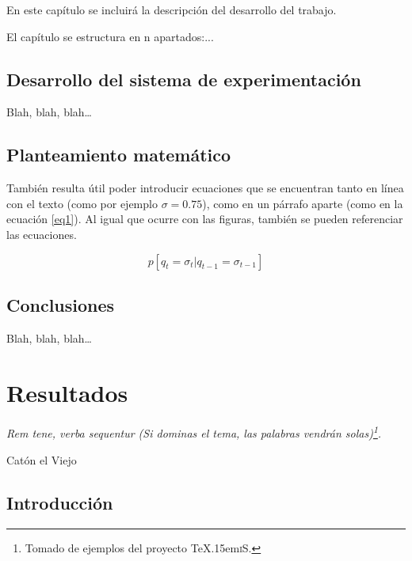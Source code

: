 \documentclass[spanish,openright]{book}
\def\texis{\TeX \raise.15em\hbox{\textsc{i}}S}
\newenvironment{FraseCelebre}{\begin{list}{}{\setlength{\leftmargin}{0.5\textwidth}\setlength{\parsep}{0cm}\addtolength{\topsep}{0.5cm}}
  }
  {\unskip \end{list}}
\newenvironment{Frase}{\item \begin{flushright}\small\em}{\end{flushright}}
\newenvironment{Fuente}{\item \begin{flushright}\small}{\end{flushright}}
\begin{document}
En este capítulo se incluirá la descripción del desarrollo del trabajo.

El capítulo se estructura en n apartados:...


\section{Desarrollo del sistema de experimentación}
\label{sec:desarr-del-sist}

Blah, blah, blah\ldots


\section{Planteamiento matemático}
\label{sec:libr-desarr}

También resulta útil poder introducir ecuaciones que se encuentran tanto
en línea con el texto (como por ejemplo $\sigma=0.75$), como en un
párrafo aparte (como en la ecuación \ref{eq1}). Al igual que ocurre con
las figuras, también se pueden referenciar las ecuaciones.

\begin{equation}
  \label{eq1}
  p[q_t=\sigma_t|q_{t-1}=\sigma_{t-1}]
\end{equation}

\section{Conclusiones}
\label{sec:conclusiones-desarrollo}

Blah, blah, blah\ldots



 


\chapter{Resultados}
\label{cha:resultados}


\begin{FraseCelebre}
  \begin{Frase}
Rem tene, verba sequentur (Si dominas el tema, las palabras vendrán
    solas)\footnote{Tomado de ejemplos del proyecto \texis{}.}.
  \end{Frase}
  \begin{Fuente}
Catón el Viejo
  \end{Fuente}
\end{FraseCelebre}

\section{Introducción}
\label{sec:introduccion-resultados}
\end{document}
